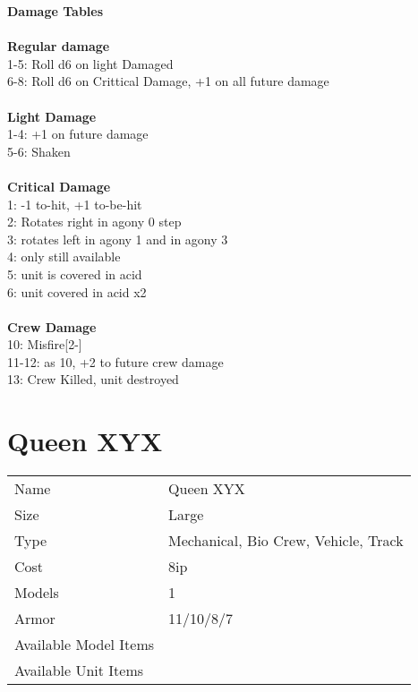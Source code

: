 {\bf Damage Tables} \\
\ \\ {\bf Regular damage } \\
1-5: Roll d6 on light Damaged \\
6-8: Roll d6 on Crittical Damage, +1 on all future damage \\
\ \\ {\bf Light Damage } \\
1-4: +1 on future damage \\
5-6: Shaken \\
\ \\ {\bf Critical Damage } \\
1: -1 to-hit, +1 to-be-hit \\
2: Rotates right in agony 0 step \\
3: rotates left in agony 1 and in agony 3 \\
4: only still available \\
5: unit is covered in acid \\
6: unit covered in acid x2 \\
\ \\ {\bf Crew Damage } \\
10: Misfire[2-] \\
11-12: as 10, +2 to future crew damage \\
13: Crew Killed, unit destroyed \\









\pagebreak

\section{ Queen XYX }

\begin{tabular}{ll}
  Name & Queen XYX \\
  Size & Large\\
  Type & Mechanical, Bio Crew, Vehicle, Track\\
  Cost & 8ip\\
  Models & 1\\
  Armor & 11/10/8/7\\
  Available Model Items &  \\
  Available Unit Items &  \\
\end{tabular}

